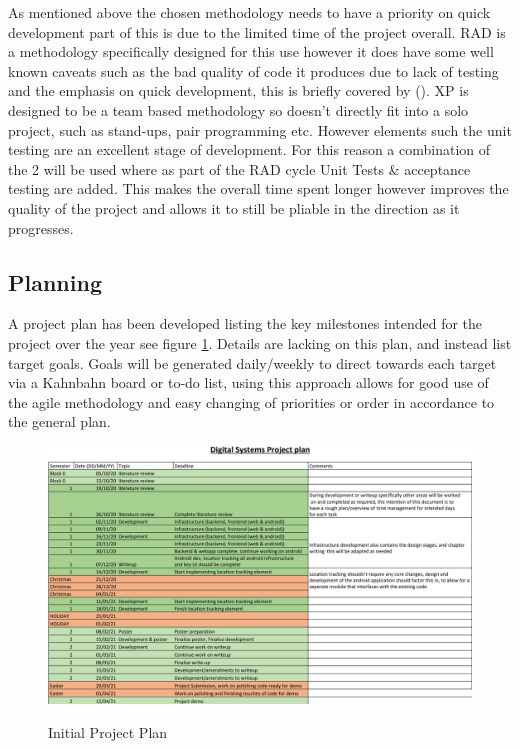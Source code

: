 As mentioned above the chosen methodology needs to have a priority on quick development part of this is due to the limited time of the project overall. RAD is a methodology specifically designed for this use however it does have some well known caveats such as the bad quality of code it produces due to lack of testing and the emphasis on quick development, this is briefly covered by (\cite{kissflow_2019_rapid}). XP is designed to be a team based methodology so doesn't directly fit into a solo project, such as stand-ups, pair programming etc. However elements such the unit testing are an excellent stage of development. For this reason a combination of the 2 will be used where as part of the RAD cycle Unit Tests \& acceptance testing are added. This makes the overall time spent longer however improves the quality of the project and allows it to still be pliable in the direction as it progresses.
\pagebreak
\subsection{Planning}
A project plan has been developed listing the key milestones intended for the project over the year see figure \ref{fig:projlan}. Details are lacking on this plan, and instead list target goals. Goals will be generated daily/weekly to direct towards each target via a Kahnbahn board or to-do list, using this approach allows for good use of the agile methodology and easy changing of priorities or order in accordance to the general plan.

\begin{figure}[h]
	\includegraphics[width=\linewidth]{./images/planning/projectplan.png}\\
	\caption{Initial Project Plan}
	\label{fig:projlan}
\end{figure}

